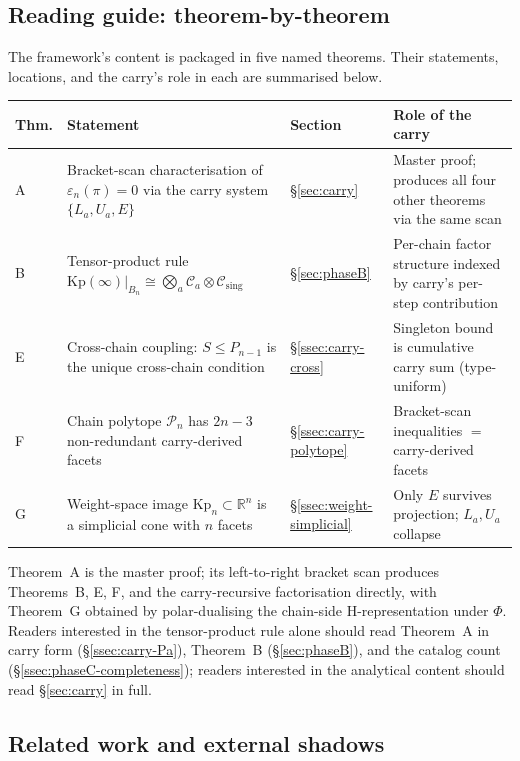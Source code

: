 \documentclass[11pt]{article}
\theoremstyle{definition}
\theoremstyle{remark}
\newcommand{\Kp}{\mathrm{Kp}}
\newcommand{\Cmid}{\mathcal{C}}
\newcommand{\Csing}{\mathcal{C}_{\mathrm{sing}}}
\newcommand{\eps}{\varepsilon}
\newcommand{\Pn}{\mathcal{P}}
\begin{document}
\subsection{Reading guide: theorem-by-theorem}\label{ssec:reading-guide}

The framework's content is packaged in five named theorems. Their statements, locations, and
the carry's role in each are summarised below.

\begin{center}
\renewcommand{\arraystretch}{1.18}
\begin{tabular}{@{}lp{}lp{}@{}}
\hline
Thm. & Statement & Section & Role of the carry \\
\hline
A & Bracket-scan characterisation of $\eps_n(\pi) = 0$ via the carry system
$\{L_a, U_a, E\}$ & \S\ref{sec:carry} & Master proof; produces all four other
theorems via the same scan \\
B & Tensor-product rule $\Kp(\infty)|_{B_n} \cong \bigotimes_a \Cmid_a \otimes \Csing$ &
\S\ref{sec:phaseB} & Per-chain factor structure indexed by carry's per-step contribution \\
E & Cross-chain coupling: $S \le P_{n - 1}$ is the unique cross-chain condition &
\S\ref{ssec:carry-cross} & Singleton bound is cumulative carry sum (type-uniform) \\
F & Chain polytope $\Pn_n$ has $2n - 3$ non-redundant carry-derived facets &
\S\ref{ssec:carry-polytope} & Bracket-scan inequalities $=$ carry-derived facets \\
G & Weight-space image $\Kp_n \subset \mathbb{R}^n$ is a simplicial cone with $n$ facets &
\S\ref{ssec:weight-simplicial} & Only $E$ survives projection; $L_a, U_a$ collapse \\
\hline
\end{tabular}
\end{center}

Theorem~A is the master proof; its left-to-right bracket scan produces Theorems~B, E, F, and
the carry-recursive factorisation directly, with Theorem~G obtained by polar-dualising the
chain-side H-representation under $\Phi$. Readers interested in the tensor-product rule alone
should read Theorem~A in carry form (\S\ref{ssec:carry-Pa}), Theorem~B (\S\ref{sec:phaseB}),
and the catalog count (\S\ref{ssec:phaseC-completeness}); readers interested in the analytical
content should read \S\ref{sec:carry} in full.

\subsection{Related work and external shadows}\label{ssec:related-work}
\end{document}
